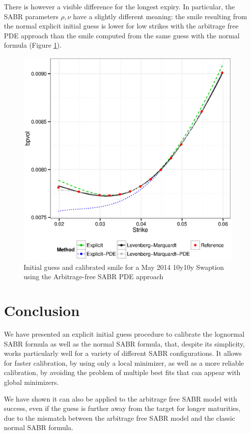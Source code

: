 \documentclass[]{rAMF2e}
\begin{document}
There is however a visible difference for the longest expiry. In particular, the SABR parameters $\rho, \nu$ have a slightly different meaning: the smile resulting from the normal explicit initial guess is lower for low strikes with the arbitrage free PDE approach than the smile computed from the same guess with the normal formula (Figure \ref{fig:normal_vs_arbfree_fit_10y10y}).

\begin{figure}[htbp]
  \caption{\label{fig:normal_vs_arbfree_fit_10y10y}Initial guess and calibrated smile for a May 2014 10y10y Swaption using the Arbitrage-free SABR PDE approach }
\begin{center}
 \includegraphics[width=11.5cm]{normal_vs_arbfree_fit_10y10y.eps}
\end{center}
\end{figure}

\section{Conclusion}
We have presented an explicit initial guess procedure to calibrate the lognormal SABR formula as well as the normal SABR formula, that, despite its simplicity, works particularly well for a variety of different SABR configurations. It allows for faster calibration, by using only a local minimizer, as well as a more reliable calibration, by avoiding the problem of multiple best fits that can appear with global minimizers. 

We have shown it can also be applied to the arbitrage free SABR model with success, even if the guess is further away from the target for longer maturities, due to the mismatch between the arbitrage free SABR model and the classic normal SABR formula.
\end{document}
